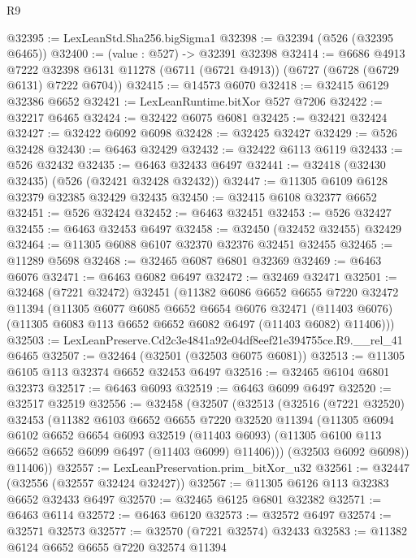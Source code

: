 \begin{lexlean}{R9}
\begin{coremodule}
@32395 := LexLeanStd.Sha256.bigSigma1
@32398 := @32394 (@526 (@32395 @6465))
@32400 := (value : @527) -> @32391 @32398
@32414 := @6686
    @4913
    @7222
    @32398
    @6131
    @11278
    (@6711 (@6721 @4913))
    (@6727 (@6728 (@6729 @6131) @7222 @6704))
@32415 := @14573 @6070
@32418 := @32415 @6129 @32386 @6652
@32421 := LexLeanRuntime.bitXor @527 @7206
@32422 := @32217 @6465
@32424 := @32422 @6075 @6081
@32425 := @32421 @32424
@32427 := @32422 @6092 @6098
@32428 := @32425 @32427
@32429 := @526 @32428
@32430 := @6463 @32429
@32432 := @32422 @6113 @6119
@32433 := @526 @32432
@32435 := @6463 @32433 @6497
@32441 := @32418 (@32430 @32435) (@526 (@32421 @32428 @32432))
@32447 := @11305 @6109 @6128 @32379 @32385 @32429 @32435
@32450 := @32415 @6108 @32377 @6652
@32451 := @526 @32424
@32452 := @6463 @32451
@32453 := @526 @32427
@32455 := @6463 @32453 @6497
@32458 := @32450 (@32452 @32455) @32429
@32464 := @11305 @6088 @6107 @32370 @32376 @32451 @32455
@32465 := @11289 @5698
@32468 := @32465 @6087 @6801 @32369
@32469 := @6463 @6076
@32471 := @6463 @6082 @6497
@32472 := @32469 @32471
@32501 := @32468
    (@7221 @32472)
    @32451
    (@11382
      @6086
      @6652
      @6655
      @7220
      @32472
      @11394
      (@11305
        @6077
        @6085
        @6652
        @6654
        @6076
        @32471
        (@11403 @6076)
        (@11305 @6083 @113 @6652 @6652 @6082 @6497 (@11403 @6082) @11406)))
@32503 := LexLeanPreserve.Cd2c3e4841a92e04df8eef21e394755ce.R9.__rel_41 @6465
@32507 := @32464 (@32501 (@32503 @6075 @6081))
@32513 := @11305 @6105 @113 @32374 @6652 @32453 @6497
@32516 := @32465 @6104 @6801 @32373
@32517 := @6463 @6093
@32519 := @6463 @6099 @6497
@32520 := @32517 @32519
@32556 := @32458
    (@32507
      (@32513
        (@32516
          (@7221 @32520)
          @32453
          (@11382
            @6103
            @6652
            @6655
            @7220
            @32520
            @11394
            (@11305
              @6094
              @6102
              @6652
              @6654
              @6093
              @32519
              (@11403 @6093)
              (@11305 @6100 @113 @6652 @6652 @6099 @6497 (@11403 @6099) @11406)))
          (@32503 @6092 @6098))
        @11406))
@32557 := LexLeanPreservation.prim_bitXor_u32
@32561 := @32447 (@32556 (@32557 @32424 @32427))
@32567 := @11305 @6126 @113 @32383 @6652 @32433 @6497
@32570 := @32465 @6125 @6801 @32382
@32571 := @6463 @6114
@32572 := @6463 @6120
@32573 := @32572 @6497
@32574 := @32571 @32573
@32577 := @32570 (@7221 @32574) @32433
@32583 := @11382 @6124 @6652 @6655 @7220 @32574 @11394

\end{coremodule}
\end{lexlean}
